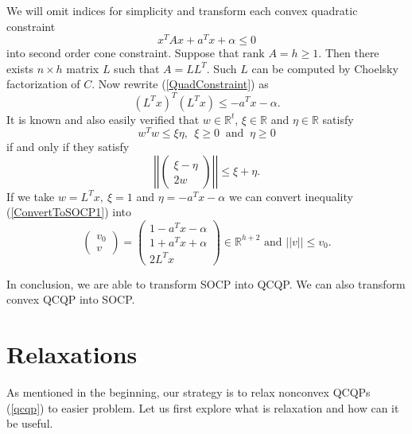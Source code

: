 \documentclass[10pt,oneside]{book}
\theoremstyle{definition}
\begin{document}
We will omit indices for simplicity and transform each convex quadratic constraint 
\begin{equation}
\label{QuadConstraint}
x^TAx + a^Tx + \alpha \leq 0
\end{equation} into second order cone constraint.  Suppose that $\mbox{rank }A = h\geq 1.$ Then there exists $n\times h$ matrix $L$ such that $A=LL^T$. Such $L$ can be computed by Choelsky factorization of $C$. Now rewrite (\ref{QuadConstraint}) as 
\begin{equation}
\label{ConvertToSOCP1}
(L^Tx)^T(L^Tx)\leq -a^Tx -\alpha.
\end{equation}
It is known and also easily verified that $w\in \mathbb{R}^t$, $\xi \in \mathbb{R}$ and $\eta \in \mathbb{R}$ satisfy
$$w^Tw\leq \xi\eta, \ \ \xi\geq 0\ \mbox{ and } \ \eta\geq 0$$
if and only if they satisfy
$$\left|\left|\left( \begin{array}{c}
\xi-\eta\\
2w
\end{array}\right)\right|\right|
\leq \xi+\eta . $$
If we take $w=L^Tx, \ \xi = 1$ and $\eta = -a^Tx -\alpha$ we can convert inequality (\ref{ConvertToSOCP1}) into
\begin{equation}
\label{ConvertedQCintoSOCC}
\left(\begin{array}{c}
v_0\\
v
\end{array}\right) = 
\left(\begin{array}{c}
1-a^Tx-\alpha\\
1+a^Tx+\alpha\\
2L^Tx
\end{array}\right)\in \mathbb{R}^{h+2}
\mbox{  and  } ||v||\leq v_0.
\end{equation}

In conclusion, we are able to transform SOCP into QCQP. We can also transform convex QCQP into SOCP. 

\section{Relaxations}

As mentioned in the beginning, our strategy is to relax nonconvex QCQPs (\ref{qcqp}) to easier problem. Let us first explore what is relaxation and how can it be useful.
\end{document}
